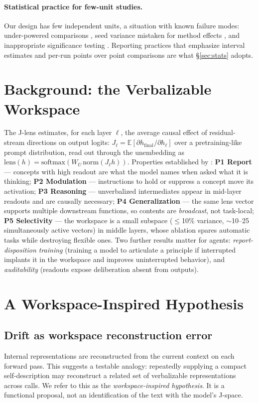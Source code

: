 \documentclass{article}
\newcommand{\jlens}{J\mbox{-}lens}
\begin{document}
\paragraph{Statistical practice for few-unit studies.} Our design has few independent units, a situation with known failure modes: under-powered comparisons \citep{card2020power}, seed variance mistaken for method effects \citep{henderson2018deeprl,bouthillier2021variance}, and inappropriate significance testing \citep{dror2018hitchhiker}. Reporting practices that emphasize interval estimates and per-run points over point comparisons \citep{agarwal2021precipice} are what \S\ref{sec:stats} adopts.

\section{Background: the Verbalizable Workspace}
\label{sec:background}
The \jlens{} estimates, for each layer $\ell$, the average causal effect of residual-stream directions on output logits: $J_\ell = \mathbb{E}\!\left[\partial h_{\mathrm{final}}/\partial h_\ell\right]$ over a pretraining-like prompt distribution, read out through the unembedding as $\mathrm{lens}(h)=\mathrm{softmax}(W_U\,\mathrm{norm}(J_\ell h))$. Properties established by \citet{gurnee2026}: \textbf{P1 Report} --- concepts with high readout are what the model names when asked what it is thinking; \textbf{P2 Modulation} --- instructions to hold or suppress a concept move its activation; \textbf{P3 Reasoning} --- unverbalized intermediates appear in mid-layer readouts and are causally necessary; \textbf{P4 Generalization} --- the same lens vector supports multiple downstream functions, so contents are \emph{broadcast}, not task-local; \textbf{P5 Selectivity} --- the workspace is a small subspace ($\leq$10\% variance, $\sim$10--25 simultaneously active vectors) in middle layers, whose ablation spares automatic tasks while destroying flexible ones. Two further results matter for agents: \emph{report-disposition training} (training a model to articulate a principle if interrupted implants it in the workspace and improves uninterrupted behavior), and \emph{auditability} (readouts expose deliberation absent from outputs).

\section{A Workspace-Inspired Hypothesis}
\label{sec:argument}
\subsection{Drift as workspace reconstruction error}
Internal representations are reconstructed from the current context on each forward pass. This suggests a testable analogy: repeatedly supplying a compact self-description may reconstruct a related set of verbalizable representations across calls. We refer to this as the \emph{workspace-inspired hypothesis}. It is a functional proposal, not an identification of the text with the model's J-space.
\end{document}
